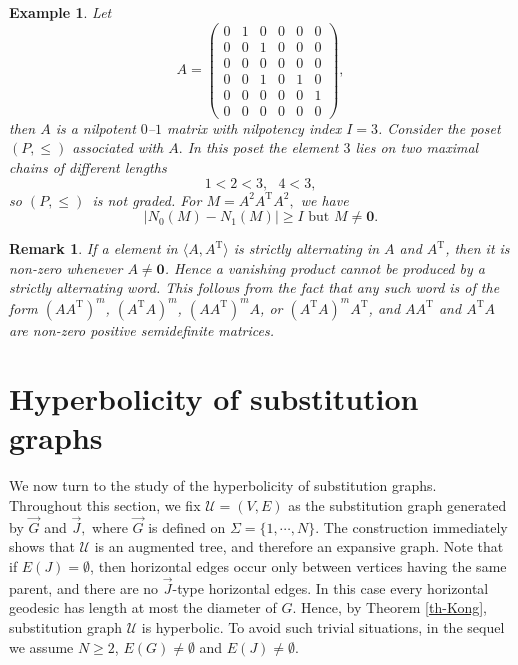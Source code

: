 \documentclass[reqno]{amsart}
\theoremstyle{plain}
\newtheorem{example}{Example}
\newtheorem{remark}{Remark}
\numberwithin{equation}{section}
\begin{document}
\begin{example}
Let%
\begin{equation*}
A=%
\begin{pmatrix}
0 & 1 & 0 & 0 & 0 & 0 \\ 
0 & 0 & 1 & 0 & 0 & 0 \\ 
0 & 0 & 0 & 0 & 0 & 0 \\ 
0 & 0 & 1 & 0 & 1 & 0 \\ 
0 & 0 & 0 & 0 & 0 & 1 \\ 
0 & 0 & 0 & 0 & 0 & 0%
\end{pmatrix}%
,
\end{equation*}%
then $A$ is a nilpotent $0$--$1$ matrix with nilpotency index $I=3$.
Consider the poset $(P,\leq )$ associated with $A.$ In this poset the
element $3$ lies on two maximal chains of different lengths%
\begin{equation*}
1<2<3,\text{ }4<3,
\end{equation*}%
so $(P,\leq )$\ is not graded. For $M=A^{2}A^{\mathrm{T}}A^{2},$ we have 
\begin{equation*}
\left\vert N_{0}(M)-N_{1}(M)\right\vert \geq I\text{ but }M\neq \mathbf{0}.
\end{equation*}
\end{example}

\begin{remark}
\label{rmk0}If a element in $\langle A,A^{\mathrm{T}}\rangle $ is strictly
alternating in $A$ and $A^{\mathrm{T}}$, then it is non-zero whenever $A\neq 
\mathbf{0}$. Hence a vanishing product cannot be produced by a strictly
alternating word. This follows from the fact that any such word is of the
form $(AA^{\mathrm{T}})^{m}$, $(A^{\mathrm{T}}A)^{m}$, $(AA^{\mathrm{T}%
})^{m}A$, or $(A^{\mathrm{T}}A)^{m}A^{\mathrm{T}}$, and $AA^{\mathrm{T}}$
and $A^{\mathrm{T}}A$ are non-zero positive semidefinite matrices.
\end{remark}

\bigskip

\section{Hyperbolicity of substitution graphs}

We now turn to the study of the hyperbolicity of substitution graphs.
Throughout this section, we fix $\mathcal{U}=(V,E)$ as the substitution
graph generated by $\overrightarrow{G}$ and $\overrightarrow{J},$ where $%
\overrightarrow{G}$ is defined on $\Sigma =\{1,\cdots ,N\}.$ The
construction immediately shows that $\mathcal{U}$ is an augmented tree, and
therefore an expansive graph. Note that if $E(J)=\emptyset $, then
horizontal edges occur only between vertices having the same parent, and
there are no $\overrightarrow{J}$-type horizontal edges. In this case every
horizontal geodesic has length at most the diameter of $G$. Hence, by
Theorem \ref{th-Kong}, substitution graph $\mathcal{U}$ is hyperbolic. To
avoid such trivial situations, in the sequel we assume $N\geq 2$, $E(G)\neq
\emptyset $ and $E(J)\neq \emptyset $.
\end{document}
